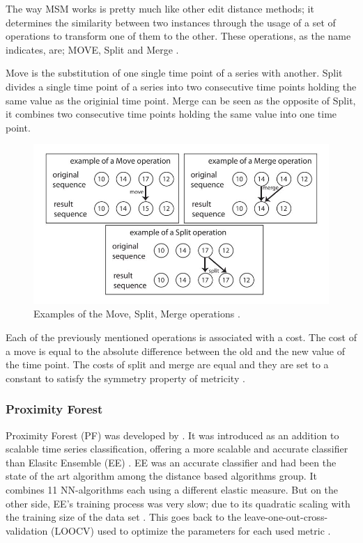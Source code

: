 The way MSM works is pretty much like other edit distance methods; it determines the similarity between two instances
through the usage of a set of operations to transform one of them to the other. These operations, as the name indicates, are; MOVE, Split and Merge \cite{bagnall2017great}.

Move is the substitution of one single time point of a series with another.
Split divides a single time point of a series into two consecutive time points holding the same value as the originial time point.
Merge can be seen as the opposite of Split, it combines two consecutive time points holding the same value into one time point.

\begin{figure}[!htbp]
    \captionsetup{justification=raggedright}
    \centering
    \includegraphics[scale = 0.5]{MSM.JPG}
    \centering
    \caption{Examples of the Move, Split, Merge operations \cite{stefan2012move}.}
    \label{Img:MSM}
\end{figure}

Each of the previously mentioned operations is associated with a cost.
The cost of a move is equal to the absolute difference between the old and the new value of the time point.
The costs of split and merge are equal and they are set to a constant to satisfy the symmetry property of metricity \cite{stefan2012move,tan2020fastee}.
\subsubsection{Proximity Forest}
\label{SubsubsectionPForest}
Proximity Forest (PF) was developed by \cite{lucas2019proximity}.
It was introduced as an addition to scalable time series classification, offering a more scalable and accurate classifier than Elasitc Ensemble (EE) \cite{tan2020fastee}.
EE was an accurate classifier and had been the state of the art algorithm among the distance based algorithms group. It combines 11 NN-algorithms each using a different elastic measure.
But on the other side, EE's training process was very slow; due to its quadratic scaling with the training size of the data set \cite{lines2015time,bagnall2017great}.
This goes back to the leave-one-out-cross-validation (LOOCV) used to optimize the parameters for each used metric \cite{shifaz2020ts}.

